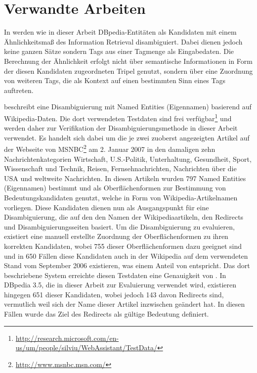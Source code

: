 \chapter{Verwandte Arbeiten}\label{relatedwork}

In \citet{tag_disambiguation_dbpedia} werden wie in dieser Arbeit DBpedia-Entitäten als Kandidaten mit einem Ähnlichkeitsmaß des Information Retrieval disambiguiert.
Dabei dienen jedoch keine ganzen Sätze sondern Tags aus einer Tagmenge als Eingabedaten.
Die Berechnung der Ähnlichkeit erfolgt nicht über semantische Informationen in Form der diesen Kandidaten zugeordneten Tripel genutzt, sondern über eine Zuordnung von
weiteren Tags, die als Kontext auf einen bestimmten Sinn eines Tags auftreten.

\citet{cucerzan07} beschreibt eine Disambiguierung mit Named Entities (Eigennamen) basierend auf Wikipedia-Daten.
Die dort verwendeten Testdaten sind frei verfügbar\footnote{\url{http://research.microsoft.com/en-us/um/people/silviu/WebAssistant/TestData/}} und werden daher zur Verifikation der Disambiguierungsmethode in dieser Arbeit verwendet.
Es handelt sich dabei um die je zwei zuoberst angezeigten Artikel auf der Webseite von MSNBC\footnote{\url{http://www.msnbc.msn.com/}} am 2. Januar 2007 in den damaligen zehn Nachrichtenkategorien
Wirtschaft, U.S.-Politik, Unterhaltung, Gesundheit, Sport, Wissenschaft und Technik, Reisen, Fernsehnachrichten, Nachrichten über die USA und weltweite Nachrichten.
In diesen Artikeln wurden 797 Named Entities (Eigennamen) bestimmt und als Oberflächenformen zur Bestimmung von Bedeutungskandidaten genutzt, welche 
in Form von Wikipedia-Artikelnamen vorliegen. Diese Kandidaten dienen nun als Ausgangspunkt für eine Disambiguierung, die auf 
den den Namen der Wikipediaartikeln, den Redirects und Disambiguierungsseiten basiert.
Um die Disambiguierung zu evaluieren, existiert eine manuell erstellte Zuordnung der Oberflächenformen zu ihren korrekten Kandidaten, wobei 755 dieser Oberflächenformen dazu geeignet sind
und in 650 Fällen diese Kandidaten auch in der Wikipedia auf dem verwendeten Stand vom September 2006 existieren, was einem Anteil von  entspricht.
Das dort beschriebene System erreichte diesen Testdaten eine Genauigkeit von .
In DBpedia 3.5, die in dieser Arbeit zur Evaluierung verwendet wird, existieren hingegen 651 dieser Kandidaten, wobei jedoch 143 davon Redirects sind, vermutlich weil sich der Name dieser Artikel 
inzwischen geändert hat. In diesen Fällen wurde das Ziel des Redirects als gültige Bedeutung definiert.

